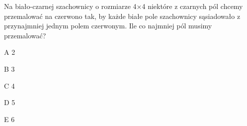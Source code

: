 \begin{tresc}
Na biało-czarnej szachownicy o rozmiarze 4×4 niektóre z czarnych pól chcemy przemalować na czerwono tak, by każde białe pole szachownicy sąsiadowało z przynajmniej jednym polem czerwonym. Ile co najmniej pól musimy przemalować?
\end{tresc}
\begin{wariant}{A} 2 \end{wariant}
\begin{wariant}{B} 3 \end{wariant}
\begin{wariant}{C} 4 \end{wariant}
\begin{wariant}{D} 5 \end{wariant}
\begin{wariant}{E} 6 \end{wariant}
